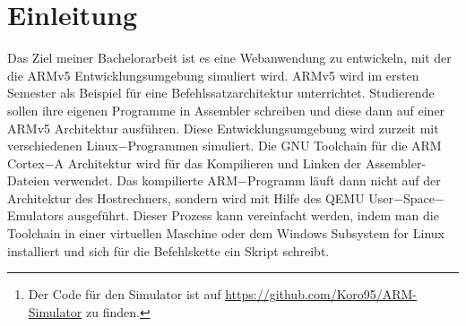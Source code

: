 \documentclass[a4paper, 11pt, onecolumn]{article}
\begin{document}


\newpage    
    
\begin{abstract}

Der ARM Simulator\footnote{Der Code für den Simulator ist auf \url{https://github.com/Koro95/ARM-Simulator} zu finden.} stellt eine ARMv5 Entwicklungsumgebung als Webanwendung zur Verfügung. Die Anwendung verwendet einen Parser basierend auf einer Parsing Expression Grammatik, mit dem die Benutzereingabe schnell und effizient analysiert werden kann. Der Code von Benutzer:innen wird anschließend in einen simulierten Hauptspeicher geschrieben und kann mit der Code Execution Engine, die auch als Debugger dient, ausgeführt werden. Mit dem Debugger kann dann der Code Zeile für Zeile oder bis zu bestimmten Breakpoints ausgeführt werden. Während der gesamten Ausführung wird dabei der Zustand der Register, des Statusregisters und des Hauptspeichers angezeigt. Der Inhalt der Register und des Hauptspeichers kann jederzeit von Benutzer:innen verändert werden. Diese Funktionen vereinfachen die Fehlersuche und das Debugging der Assembler Programme. Der Simulator ist in TypeScript geschrieben und benutzt das Webframework React als Frontend. React funktioniert in jedem modernen Browser und Benutzer:innen können, ohne Installation von zusätzlichen Programmen oder Tools, ihren ARMv5 Code direkt in ihrem Webbrowser ausführen und analysieren.



\end{abstract}

\newpage

\tableofcontents

\newpage

\setcounter{page}{1}

\section{Einleitung}

Das Ziel meiner Bachelorarbeit ist es eine Webanwendung zu entwickeln, mit der die ARMv5 Entwicklungsumgebung simuliert wird. ARMv5 \cite{arm:2005} wird im ersten Semester als Beispiel für eine Befehlssatzarchitektur unterrichtet. Studierende sollen ihre eigenen Programme in Assembler \cite{assembly} schreiben und diese dann auf einer ARMv5 Architektur ausführen. Diese Entwicklungsumgebung wird zurzeit mit verschiedenen Linux$-$Programmen simuliert. Die GNU Toolchain für die ARM Cortex$-$A Architektur \cite{gnutoolchain} wird für das Kompilieren und Linken der Assembler-Dateien verwendet. Das kompilierte ARM$-$Programm läuft dann nicht auf der Architektur des Hostrechners, sondern wird mit Hilfe des QEMU User$-$Space$-$Emulators \cite{qemu} ausgeführt. Dieser Prozess kann vereinfacht werden, indem man die Toolchain in einer virtuellen Maschine oder dem Windows Subsystem for Linux \cite{wsl} installiert und sich für die Befehlskette ein Skript schreibt.
\end{document}
